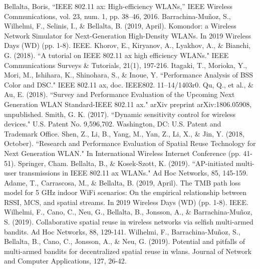 \documentclass[conference]{IEEEtran}
\begin{document}
	\begin{thebibliography}{00}
		 Bellalta, Boris, ``IEEE 802.11 ax: High-efficiency WLANs,'' IEEE Wireless Communications, vol. 23, num. 1, pp. 38--46, 2016.
		 Barrachina-Mu\~noz, S., Wilhelmi, F., Selinis, I., \& Bellalta, B. (2019, April). Komondor: a Wireless Network Simulator for Next-Generation High-Density WLANs. In 2019 Wireless Days (WD) (pp. 1-8). IEEE.
		 Khorov, E., Kiryanov, A., Lyakhov, A., \& Bianchi, G. (2018). ``A tutorial on IEEE 802.11 ax high efficiency WLANs." IEEE Communications Surveys \& Tutorials, 21(1), 197-216.
		 Itagaki, T., Morioka, Y., Mori, M., Ishihara, K., Shinohara, S., \& Inoue, Y. ``Performance Analysis of BSS Color and DSC." IEEE 802.11 ax, doc. IEEE802. 11–14/1403r0. 
		 Qu, Q., et al., \& Au, E. (2018). ``Survey and Performance Evaluation of the Upcoming Next Generation WLAN Standard-IEEE 802.11 ax." arXiv preprint arXiv:1806.05908, unpublished.
		 Smith, G. K. (2017). ``Dynamic sensitivity control for wireless devices." U.S. Patent No. 9,596,702. Washington, DC: U.S. Patent and Trademark Office.
		 Shen, Z., Li, B., Yang, M., Yan, Z., Li, X., \& Jin, Y. (2018, October). ``Research and Performance Evaluation of Spatial Reuse Technology for Next Generation WLAN." In International Wireless Internet Conference (pp. 41-51). Springer, Cham.
		 Bellalta, B., \& Kosek-Szott, K. (2019). ``AP-initiated multi-user transmissions in IEEE 802.11 ax WLANs." Ad Hoc Networks, 85, 145-159.
		 Adame, T., Carrascosa, M., \& Bellalta, B. (2019, April). The TMB path loss model for 5 GHz indoor WiFi scenarios: On the empirical relationship between RSSI, MCS, and spatial streams. In 2019 Wireless Days (WD) (pp. 1-8). IEEE.
		 Wilhelmi, F., Cano, C., Neu, G., Bellalta, B., Jonsson, A., \& Barrachina-Mu\~noz, S. (2019). Collaborative spatial reuse in wireless networks via selfish multi-armed bandits. Ad Hoc Networks, 88, 129-141.
		 Wilhelmi, F., Barrachina-Mu\~noz, S., Bellalta, B., Cano, C., Jonsson, A., \& Neu, G. (2019). Potential and pitfalls of multi-armed bandits for decentralized spatial reuse in wlans. Journal of Network and Computer Applications, 127, 26-42.
		
		
		
	\end{thebibliography}
	
\end{document}
